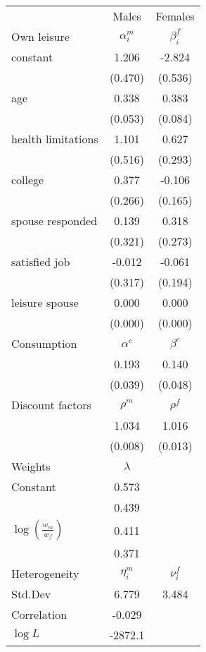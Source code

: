 \begin{tabular}{lcc} 
\hline\hline 
 & Males & Females \\ 
Own leisure & $\alpha_{i}^{m}$ & $\beta_{i}^{f}$ \\ 
constant & 1.206 & -2.824 \\ 
 & (0.470) & (0.536) \\ 
age & 0.338 & 0.383 \\ 
 & (0.053) & (0.084) \\ 
health limitations & 1.101 & 0.627 \\ 
 & (0.516) & (0.293) \\ 
college & 0.377 & -0.106 \\ 
 & (0.266) & (0.165) \\ 
spouse responded & 0.139 & 0.318 \\ 
 & (0.321) & (0.273) \\ 
satisfied job & -0.012 & -0.061 \\ 
 & (0.317) & (0.194) \\ 
leisure spouse & 0.000 & 0.000 \\ 
 & (0.000) & (0.000) \\ 
Consumption & $\alpha^{c}$ & $\beta^{c}$ \\ 
 & 0.193 & 0.140 \\ 
 & (0.039) & (0.048) \\ 
Discount factors & $\rho^m$ & $\rho^f$ \\ 
 & 1.034 & 1.016 \\ 
 & (0.008) & (0.013) \\ 
Weights & $\lambda$ &  \\ 
Constant & 0.573 &  \\ 
 & 0.439 &  \\ 
$\log(\frac{w_m}{w_f})$ & 0.411 &  \\ 
 & 0.371 &  \\ 
Heterogeneity & $\eta_i^m$ & $\nu_i^f$ \\ 
Std.Dev & 6.779 & 3.484 \\ 
Correlation & -0.029 &  \\ 
\hline 
$\log L$ & -2872.1 & \\ 
\hline \hline 
\end{tabular} 

